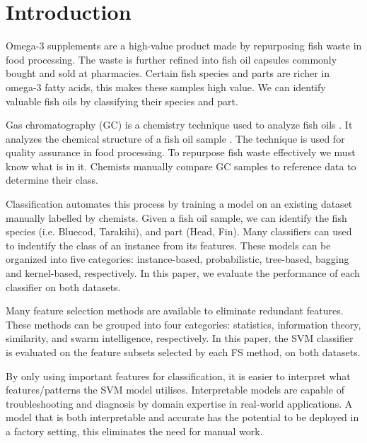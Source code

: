 \documentclass[runningheads]{llncs}
\begin{document}
\section{Introduction}
\label{introduction}


Omega-3 supplements are a high-value product made by repurposing fish waste in food processing. 
The waste is further refined into fish oil capsules commonly bought and sold at pharmacies. 
Certain fish species and parts are richer in omega-3 fatty acids, this makes these samples high value. 
We can identify valuable fish oils by classifying their species and part.

Gas chromatography (GC) is a chemistry technique used to analyze fish oils \cite{eder1995gas}. 
It analyzes the chemical structure of a fish oil sample \cite{restek2018high}. 
The technique is used for quality assurance in food processing. 
To repurpose fish waste effectively we must know what is in it. 
Chemists manually compare GC samples to reference data to determine their class. 

Classification automates this process by training a model on an existing dataset manually labelled by chemists. 
Given a fish oil sample, we can identify the fish species (i.e. Bluecod, Tarakihi), and part (Head, Fin).
Many classifiers \cite{fix1989discriminatory,hand2001idiot,ho1995random,loh2011classification,cortes1995support} can used to indentify the class of an instance from its features. 
These models can be organized into five categories: instance-based, probabilistic, tree-based, bagging and kernel-based, respectively. 
In this paper, we evaluate the performance of each classifier on both datasets. 

Many feature selection methods \cite{liu1995chi2,ding2005minimum,kononenko1994estimating,kennedy1995particle} are available to eliminate redundant features. 
These methods can be grouped into four categories: statistics, information theory, similarity, and swarm intelligence, respectively. 
In this paper, the SVM classifier \cite{cortes1995support} is evaluated on the feature subsets selected by each FS method, on both datasets. 

By only using important features for classification, it is easier to interpret what features/patterns the SVM model utilises. 
Interpretable models are capable of troubleshooting and diagnosis by domain expertise in real-world applications.
A model that is both interpretable and accurate has the potential to be deployed in a factory setting, this eliminates the need for manual work.
\end{document}

